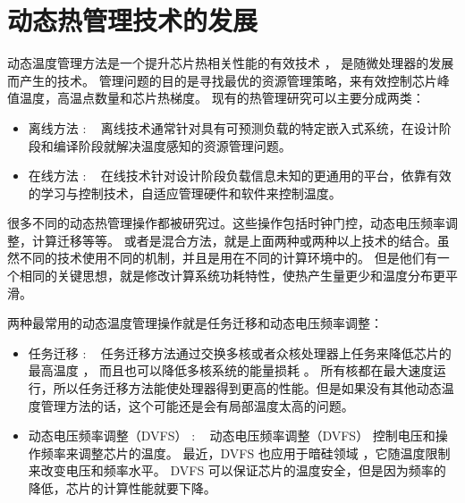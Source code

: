 \section{动态热管理技术的发展}\label{sec:his}

动态温度管理方法是一个提升芯片热相关性能的有效技术 ， 是随微处理器的发展而产生的技术。
管理问题的目的是寻找最优的资源管理策略，来有效控制芯片峰值温度，高温点数量和芯片热梯度。
现有的热管理研究可以主要分成两类：
\begin{itemize}
\item 离线方法 : ~ 离线技术通常针对具有可预测负载的特定嵌入式系统，在设计阶段和编译阶段就解决温度感知的资源管理问题。
\item 在线方法 : ~ 在线技术针对设计阶段负载信息未知的更通用的平台，依靠有效的学习与控制技术，自适应管理硬件和软件来控制温度。
\end{itemize}

很多不同的动态热管理操作都被研究过。这些操作包括时钟门控，动态电压频率调整，计算迁移等等。
或者是混合方法，就是上面两种或两种以上技术的结合。虽然不同的技术使用不同的机制，并且是用在不同的计算环境中的。
但是他们有一个相同的关键思想，就是修改计算系统功耗特性，使热产生量更少和温度分布更平滑。

两种最常用的动态温度管理操作就是任务迁移和动态电压频率调整：
\begin{itemize}
\item 任务迁移 :  ~ 任务迁移方法通过交换多核或者众核处理器上任务来降低芯片的最高温度  ，
而且也可以降低多核系统的能量损耗 。
所有核都在最大速度运行，所以任务迁移方法能使处理器得到更高的性能。但是如果没有其他动态温度管理方法的话，这个可能还是会有局部温度太高的问题。
\item 动态电压频率调整（DVFS） :  ~ 动态电压频率调整（DVFS） 控制电压和操作频率来调整芯片的温度。
 最近，DVFS 也应用于暗硅领域 ，它随温度限制来改变电压和频率水平。
 DVFS 可以保证芯片的温度安全，但是因为频率的降低，芯片的计算性能就要下降。
\end{itemize}


 
 
